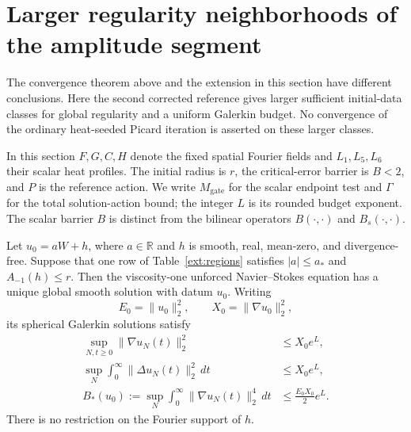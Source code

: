 \section{Larger regularity neighborhoods of the amplitude segment}
\label{ext:section}

The convergence theorem above and the extension in this section have different
conclusions. Here the second corrected reference gives larger sufficient
initial-data classes for global regularity and a uniform Galerkin budget.
No convergence of the ordinary heat-seeded Picard iteration is asserted on
these larger classes.

In this section $F,G,C,H$ denote the fixed spatial Fourier fields and
$L_1,L_5,L_6$ their scalar heat profiles. The initial radius is $r$, the
critical-error barrier is $B<2$, and $P$ is the reference action. We write
$M_{\mathrm{gate}}$ for the scalar endpoint test and $\Gamma$ for the total
solution-action bound; the integer $L$ is its rounded budget exponent.
The scalar barrier $B$ is distinct from the bilinear operators
$B(\cdot,\cdot)$ and $B_s(\cdot,\cdot)$.

\begin{theorem}\label{ext:theorem}
Let $u_0=aW+h$, where $a\in\mathbb R$ and $h$ is smooth, real, mean-zero,
and divergence-free. Suppose that one row of Table~\ref{ext:regions} satisfies
$|a|\le a_*$ and $A_{-1}(h)\le r$. Then the viscosity-one unforced
Navier--Stokes equation has a unique global smooth solution with datum $u_0$.
Writing
\[
 E_0=\|u_0\|_2^2,\qquad X_0=\|\nabla u_0\|_2^2,
\]
its spherical Galerkin solutions satisfy
\begin{align}
 \sup_{N,t\ge0}\|\nabla u_N(t)\|_2^2&\le X_0e^L,
 \label{ext:h1}\\
 \sup_N\int_0^\infty\|\Delta u_N(t)\|_2^2\,dt&\le X_0e^L,
 \label{ext:h2}\\
 B_*(u_0):=\sup_N\int_0^\infty\|\nabla u_N(t)\|_2^4\,dt
 &\le\frac{E_0X_0}{2}e^L.
 \label{ext:nsb}
\end{align}
There is no restriction on the Fourier support of $h$.
\end{theorem}


